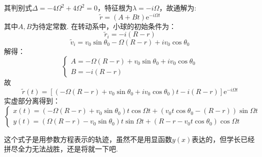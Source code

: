 \documentclass{ctexart}
\begin{document}
其判别式$\Delta=-4\varOmega^2+4\varOmega^2=0$，特征根为$\lambda=-i\varOmega$，故通解为:
\begin{equation}
  \tilde{r}=(A+Bt)\mathrm{e}^{-i\varOmega t} \tag{5.12}
\end{equation}
其中$A,B$为待定常数. 在转动系中，小球的初始条件为：
\begin{equation}
  \tilde{r}_i=-i(R-r) \tag{5.13}
\end{equation}
\begin{equation}
  \tilde{v}_i=v_0\sin{\theta_0}-\varOmega(R-r)+iv_0\cos{\theta_0} \tag{5.14}
\end{equation}
解得：
\begin{equation}
\begin{cases}
  A=-\varOmega(R-r)+v_0\sin{\theta_0}+iv_0\cos{\theta_0}\\
  B=-i(R-r)
\end{cases} \tag{5.15}
\end{equation}
故
\begin{equation}
\tilde{r}(t)=\left[\left(-\varOmega(R-r)+v_0\sin{\theta_0}+iv_0\cos{\theta_0}\right)t-i(R-r)\right]\mathrm{e}^{-i\varOmega t} \tag{5.16}
\end{equation}
实虚部分离得到：
\begin{equation}
  \begin{cases}
    x(t)=(-\varOmega(R-r)+v_0\sin{\theta_0})t\cos{\varOmega t}+(v_0t\cos{\theta_0}-(R-r))\sin{\varOmega t}\\
    y(t)=(\varOmega(R-r)-v_0\sin{\theta_0})t\sin{\varOmega t}+(R-r-v_0t\cos{\theta_0})\cos{\varOmega t}
  \end{cases} \tag{5.17}
  \end{equation}

这个式子是用参数方程表示的轨迹，虽然不是用显函数$y(x)$表达的，但学长已经拼尽全力无法战胜，还是将就一下吧.

\clearpage
\end{document}
